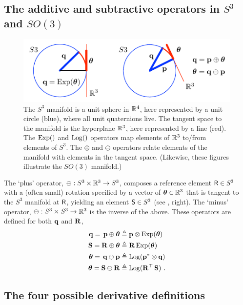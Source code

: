 \subsection{The additive and subtractive operators in $S^3$ and $SO(3)$}

\begin{figure}[tb]
\centering
\includegraphics{figures/manifold}
\caption{The $S^3$ manifold is a unit sphere in ${\mathbb R}^4$, here represented by a unit circle (blue),  where all unit quaternions live. The tangent space to the manifold is the hyperplane ${\mathbb R}^3$, here represented by a line (red). The $\operatorname*{Exp}()$ and $\operatorname*{Log}()$ operators map elements of ${\mathbb R}^3$ to/from elements of $S^3$. The $\oplus$ and $\ominus$ operators relate elements of the manifold with elements in the tangent space. (Likewise, these figures illustrate the $SO(3)$ manifold.)}
\label{fig:manifold}
\end{figure}




The `plus' operator, $\oplus:S^3\times{\mathbb R}^3\to S^3$, composes a reference element $\mathsf R\in S^3$ with a (often small) rotation specified by a vector of ${{\bm \theta}}\in{\mathbb R}^3$ that is tangent to the $S^3$ manifold at $\mathsf R$, yielding an element $\mathsf S\in S^3$ (see , right). 
The `minus' operator, $\ominus:S^3\times S^3\to{\mathbb R}^3$ is the inverse of the above.
These operators are defined for both ${\bf q}$ and ${\bf R}$,
%
\begin{align}
{\bf q} =\, {\bf p}\oplus{{\bm \theta}}  &\triangleq {\bf p}\otimes\operatorname*{Exp}({{\bm \theta}}) \label{equ:plus_q} \\
{\bf S} = {\bf R}\oplus {{\bm \theta}} &\triangleq {\bf R}\operatorname*{Exp}({{\bm \theta}}) \label{equ:plus_R} \\
{{\bm \theta}} =\, {\bf q}\ominus{\bf p} &\triangleq \operatorname*{Log}({\bf p}^*\otimes{\bf q}) \label{equ:minus_q}\\
{{\bm \theta}} = {\bf S}\ominus{\bf R} &\triangleq \operatorname*{Log}({\bf R}^{\top}\,{\bf S})  \label{equ:minus_R}
~.
\end{align}


\subsection{The four possible derivative definitions}

